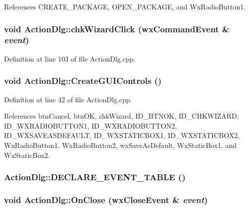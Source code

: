 References CREATE\_\-PACKAGE, OPEN\_\-PACKAGE, and Wx\-Radio\-Button1.
\subsubsection{\setlength{\rightskip}{0pt plus 5cm}void Action\-Dlg::chk\-Wizard\-Click (wx\-Command\-Event \& {\em event})}\label{class_action_dlg_1d14d00b9259e0a46b8413a9ce48a817}




Definition at line 103 of file Action\-Dlg.cpp.
\subsubsection{\setlength{\rightskip}{0pt plus 5cm}void Action\-Dlg::Create\-GUIControls ()\hspace{0.3cm}{\tt  [private]}}\label{class_action_dlg_4022fb1184a21bfd1b11dd67f509d838}




Definition at line 42 of file Action\-Dlg.cpp.

References btn\-Cancel, btn\-OK, chk\-Wizard, ID\_\-BTNOK, ID\_\-CHKWIZARD, ID\_\-WXRADIOBUTTON1, ID\_\-WXRADIOBUTTON2, ID\_\-WXSAVEASDEFAULT, ID\_\-WXSTATICBOX1, ID\_\-WXSTATICBOX2, Wx\-Radio\-Button1, Wx\-Radio\-Button2, wx\-Save\-As\-Default, Wx\-Static\-Box1, and Wx\-Static\-Box2.
\subsubsection{\setlength{\rightskip}{0pt plus 5cm}Action\-Dlg::DECLARE\_\-EVENT\_\-TABLE ()\hspace{0.3cm}{\tt  [private]}}\label{class_action_dlg_96dbd0bf13bd38c1e47ab12fa5eee182}


\subsubsection{\setlength{\rightskip}{0pt plus 5cm}void Action\-Dlg::On\-Close (wx\-Close\-Event \& {\em event})\hspace{0.3cm}{\tt  [private]}}\label{class_action_dlg_9e561449ce5e14d19be68c4af10bbbb8}




